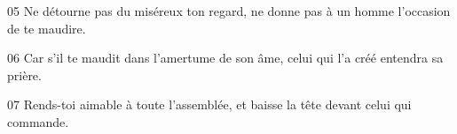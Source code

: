 
05 Ne détourne pas du miséreux ton regard, ne donne pas à un homme l’occasion de te maudire.

06 Car s’il te maudit dans l’amertume de son âme, celui qui l’a créé entendra sa prière.

07 Rends-toi aimable à toute l’assemblée, et baisse la tête devant celui qui commande.
